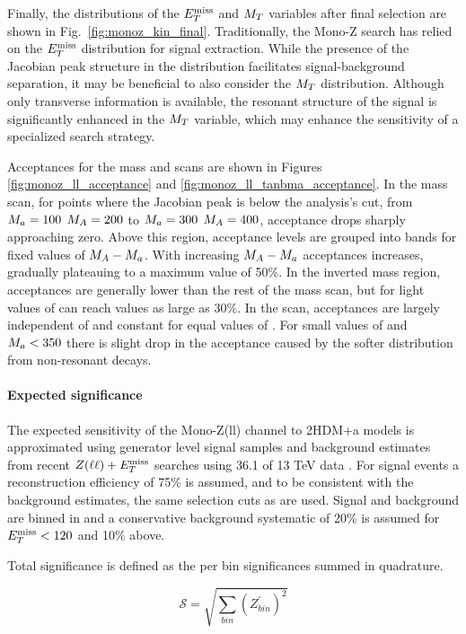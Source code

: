 Finally, the distributions of the $E_T^\mathrm{miss}$ and $M_{T}$ variables after final selection are shown in Fig.~\ref{fig:monoz_kin_final}. Traditionally, the Mono-Z search has relied on the $E_T^\mathrm{miss}$ distribution for signal extraction. While the presence of the Jacobian peak structure in the distribution facilitates signal-background separation, it may be beneficial to also consider the $M_{T}$ distribution. Although only transverse information is available, the resonant structure of the signal is significantly enhanced in the $M_{T}$ variable, which may enhance the sensitivity of a specialized search strategy.

Acceptances for the mass and \tanb scans are shown in Figures \ref{fig:monoz_ll_acceptance} and \ref{fig:monoz_ll_tanbma_acceptance}.  
In the mass scan, for points where the Jacobian peak is below the analysis's \MET cut, from $M_{a} = 100$ $M_{A} = 200$ to $M_{a} = 300$ $M_{A} = 400$, 
acceptance drops sharply approaching zero.  Above this region, acceptance levels are grouped into bands for fixed values of $M_{A}-M_{a}$. 
With increasing $M_{A}-M_{a}$ acceptances increases, gradually plateauing to a maximum value of 50\%.  In the inverted mass region, 
acceptances are generally lower than the rest of the mass scan, but for light values of \ma can reach values as large as 30\%.
In the \tanb scan, acceptances are largely independent of \tanb and constant for equal values of \ma.  For small values of \tanb and
$M_{a} < 350$ \GeV  there is slight drop in the acceptance caused by the softer \MET distribution from non-resonant decays.  


\paragraph{Expected significance}

The expected sensitivity of the Mono-Z(ll) channel to 2HDM+a models is approximated using generator level signal samples and background estimates from recent $Z(\ell \ell) + E_T^\mathrm{miss}$ searches using 36.1 \ifb of 13 TeV data \cite{Aaboud:2017bja}.  For signal events a reconstruction efficiency of 75\% is assumed, and to be consistent with the background estimates, the same selection cuts as \cite{Aaboud:2017bja} are used.  Signal and background are binned in \MET and a conservative background systematic of 20\% is assumed for $E_T^\mathrm{miss} < 120$ \GeV and 10\% above.

Total significance is defined as the per bin significances summed in quadrature.

\begin{equation}
\mathcal{S} = \sqrt{\sum_{bin} (Z^\prime_{bin})^2}
\end{equation}

